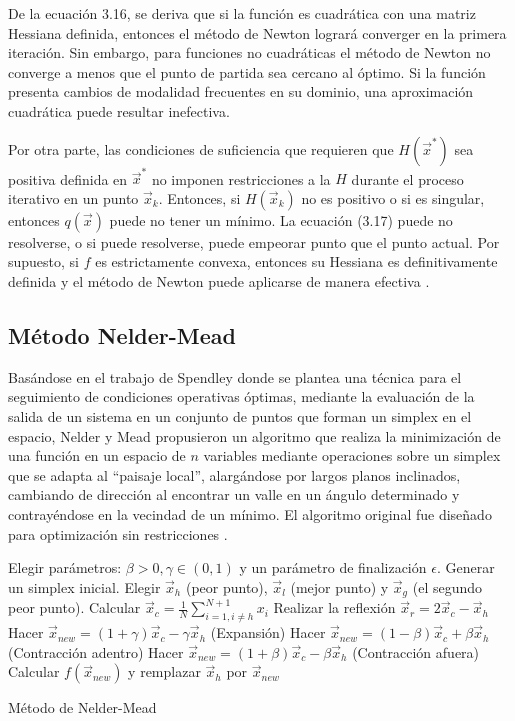 De la ecuación 3.16, se deriva que si la función es cuadrática con una matriz Hessiana definida, entonces el método de Newton logrará converger en la primera iteración. Sin embargo, para funciones no cuadráticas el método de Newton no converge a menos que el punto de partida sea cercano al óptimo. Si la función presenta cambios de modalidad frecuentes en su dominio, una aproximación cuadrática puede resultar inefectiva. 

Por otra parte, las condiciones de suficiencia que requieren que $H (\vec{x}^*)$ sea positiva definida en $\vec{x}^*$ no imponen restricciones a la $H$ durante el proceso iterativo en un punto $\vec{x}_k$.  Entonces, si  $H (\vec{x}_k)$ no es positivo o si es singular, entonces $q (\vec{x})$ puede no tener un mínimo. La ecuación (3.17) puede no resolverse, o si puede resolverse, puede empeorar punto que el punto actual. Por supuesto, si $f$ es estrictamente convexa, entonces su Hessiana es definitivamente definida y el método de Newton puede aplicarse de manera efectiva \cite{belegundu_optimization_2011}.
\subsection{Método Nelder-Mead}\label{sec: Metodo NM}
Basándose  en el trabajo de Spendley \cite{spendley_sequential_1962} donde se plantea una técnica para el seguimiento de condiciones operativas óptimas, mediante la evaluación de la salida de un sistema en un conjunto de puntos que forman un simplex en el espacio, Nelder y Mead propusieron un algoritmo que realiza la minimización de una función en un espacio de $n$ variables mediante operaciones sobre un simplex que se adapta al  ``paisaje local'', alargándose por largos planos inclinados, cambiando de dirección al encontrar un valle en un ángulo determinado y contrayéndose en la vecindad de un mínimo. El algoritmo original fue diseñado para optimización sin restricciones \cite{nelder_simplex_1965}.
\begin{algorithm}
	\begin{algorithmic}[1]
		\STATE Elegir parámetros: $\beta>0, \gamma \in (0,1)$ y un parámetro de finalización $\epsilon$. 
		\STATE Generar un simplex inicial.
		\label{lin:lineaRara}
		\STATE Elegir $\vec{x}_h$ (peor punto), $\vec{x}_l$ (mejor punto) y $\vec{x}_g$ (el segundo peor punto).
		\STATE Calcular $\vec{x}_c=\frac{1}{N} \sum_{i=1, i\neq h }^{N+1} x_i$
		\STATE Realizar la reflexión $\vec{x}_r=2\vec{x}_c -\vec{x}_h$
		\STATE Hacer $\vec{x}_{new}=(1+\gamma)\vec{x}_c-\gamma \vec{x}_h$ (Expansión)
		\ELSE {}
		\STATE Hacer $\vec{x}_{new}=(1-\beta)\vec{x}_c+\beta \vec{x}_h$ (Contracción adentro)
		\ENDIF
		\ELSE {}
		\STATE Hacer $\vec{x}_{new}=(1+\beta)\vec{x}_c-\beta \vec{x}_h$ (Contracción afuera)
		\ENDIF
		\ENDIF
		\STATE Calcular $f(\vec{x}_{new})$ y remplazar $\vec{x}_h$ por $\vec{x}_{new}$
		\ENDWHILE
	\end{algorithmic}
	\caption{Método de Nelder-Mead}\label{alg:Nelder Mead}
\end{algorithm}

